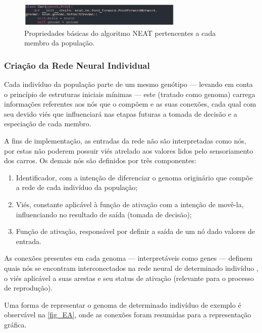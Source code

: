 \begin{figure}[htb]
        \centering
        \caption{\label{fig_DA}Propriedades básicas do algoritmo NEAT pertencentes a cada membro da população.}
        \includegraphics[width=0.7\textwidth]{images/DA.png}
\end{figure}

\subsubsection{Criação da Rede Neural Individual}
Cada indivíduo da população parte de um mesmo genótipo — levando em conta o princípio de estruturas iniciais mínimas —
este (tratado como genoma) carrega informações referentes aos nós que o compõem e as suas conexões,
cada qual com seu devido viés que influenciará nas etapas futuras a tomada de decisão e a especiação de cada membro.

A fins de implementação, as entradas da rede não são interpretadas como nós, por estas não poderem possuir
viés atrelado aos valores lidos pelo sensoriamento dos carros. Os demais nós são definidos por três componentes: 

\begin{enumerate}
	\item Identificador, com a intenção de diferenciar o genoma originário que compõe a rede de cada indivíduo da população;
	\item Viés, constante aplicável à função de ativação com a intenção de movê-la, influenciando no resultado de saída (tomada de decisão);
	\item Função de ativação, responsável por definir a saída de um nó dado valores de entrada.
\end{enumerate}

As conexões presentes em cada genoma — interpretáveis como genes — definem quais nós se encontram interconectados na rede neural de determinado indivíduo
, o viés aplicável a suas arestas e seu status de ativação (relevante para o processo de reprodução).

Uma forma de representar o genoma de determinado indivíduo de exemplo é observável na \autoref{fig_EA}, onde as conexões foram resumidas para a representação gráfica.

